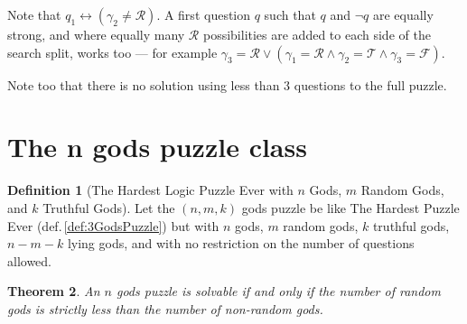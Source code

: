\documentclass[twoside,twocolumn,a4paper,11pt]{article}
\newtheorem{theorem}{Theorem}[section]
\theoremstyle{definition}
\newtheorem{defn}[theorem]{Definition}
\begin{document}
Note that $q_1\leftrightarrow (\gamma_2\!\neq\!\mathcal{R})$. A first question $q$ such that 
$q$ and $\neg q$
are equally strong, and where equally many $\mathcal{R}$ possibilities are added to each side
of the search split, works too --- for example 
$\gamma_3\!=\!\mathcal{R} \lor (\gamma_1\!=\!\mathcal{R} \land \gamma_2\!=\!\mathcal{T} \land
 \gamma_3\!=\!\mathcal{F})$.

Note too that there is no solution using less than $3$ questions to the full puzzle.




\section{The n gods puzzle class}
\label{sec:nGods}
\begin{defn}[The Hardest Logic Puzzle Ever with $n$ Gods, $m$ Random Gods, and
$k$ Truthful Gods]
\label{def:nGodsPuzzle}
Let the $(n,m,k)$ gods puzzle be like The Hardest Puzzle Ever (def.\,\ref{def:3GodsPuzzle})
but with $n$ gods, $m$ random gods, $k$ truthful gods, 
$n-m-k$ lying gods,
and with no restriction on the number of questions allowed.
\end{defn}

\begin{theorem}
\label{theorem:nGodsSolvability}
An $n$ gods puzzle is solvable if and only if the number of random gods is strictly less than
the number of non-random gods.
\end{theorem}
\end{document}
